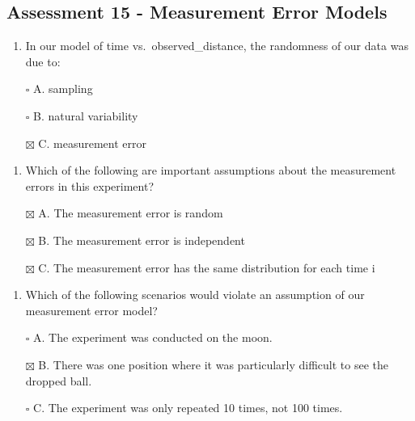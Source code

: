 \documentclass[
]{article}
\providecommand{\tightlist}{%
  \setlength{\itemsep}{0pt}\setlength{\parskip}{0pt}}
\begin{document}
\hypertarget{assessment-15---measurement-error-models}{%
\subsection{Assessment 15 - Measurement Error
Models}\label{assessment-15---measurement-error-models}}

\begin{enumerate}
\def\labelenumi{\arabic{enumi}.}
\tightlist
\item
  In our model of time vs.~observed\_distance, the randomness of our
  data was due to:
\end{enumerate}

\begin{itemize}
\tightlist
\item[$\square$]
  A. sampling
\item[$\square$]
  B. natural variability
\item[$\boxtimes$]
  C. measurement error
\end{itemize}

\begin{enumerate}
\def\labelenumi{\arabic{enumi}.}
\setcounter{enumi}{1}
\tightlist
\item
  Which of the following are important assumptions about the measurement
  errors in this experiment?
\end{enumerate}

\begin{itemize}
\tightlist
\item[$\boxtimes$]
  A. The measurement error is random
\item[$\boxtimes$]
  B. The measurement error is independent
\item[$\boxtimes$]
  C. The measurement error has the same distribution for each time i
\end{itemize}

\begin{enumerate}
\def\labelenumi{\arabic{enumi}.}
\setcounter{enumi}{2}
\tightlist
\item
  Which of the following scenarios would violate an assumption of our
  measurement error model?
\end{enumerate}

\begin{itemize}
\tightlist
\item[$\square$]
  A. The experiment was conducted on the moon.
\item[$\boxtimes$]
  B. There was one position where it was particularly difficult to see
  the dropped ball.
\item[$\square$]
  C. The experiment was only repeated 10 times, not 100 times.
\end{itemize}
\end{document}
